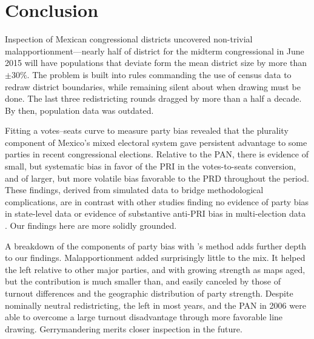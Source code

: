 \documentclass[letter,12pt]{article}
\begin{document}
\section{Conclusion}


Inspection of Mexican congressional districts uncovered non-trivial malapportionment---nearly half of district for the midterm congressional in June 2015 will have populations that deviate form the mean district size by more than $\pm30\%$. The problem is built into rules commanding the use of census data to redraw district boundaries, while remaining silent about when drawing must be done. The last three redistricting rounds dragged by more than a half a decade. By then, population data was outdated. 

Fitting a votes--seats curve to measure party bias revealed that the plurality component of Mexico's mixed electoral system gave persistent advantage to some parties in recent congressional elections. Relative to the PAN, there is evidence of small, but systematic bias in favor of the PRI in the votes-to-seats conversion, and of larger, but more volatile bias favorable to the PRD throughout the period. These findings, derived from simulated data to bridge methodological complications, are in contrast with other studies finding no evidence of party bias in state-level data \citep{magar.altman.mcd.trelles2014uh} or evidence of substantive anti-PRI bias in multi-election data \citep{marquez2014biasBlog}. Our findings here are more solidly grounded. 

A breakdown of the components of party bias with \citeauthor{grofman.etalBiasMalapp.1997}'s method adds further depth to our findings. Malapportionment added surprisingly little to the mix. It helped the left relative to other major parties, and with growing strength as maps aged, but the contribution is much smaller than, and easily canceled by those of turnout differences and the geographic distribution of party strength. Despite nominally neutral redistricting, the left in most years, and the PAN in 2006 were able to overcome a large turnout disadvantage through more favorable line drawing. Gerrymandering merits closer inspection in the future. 
\end{document}
